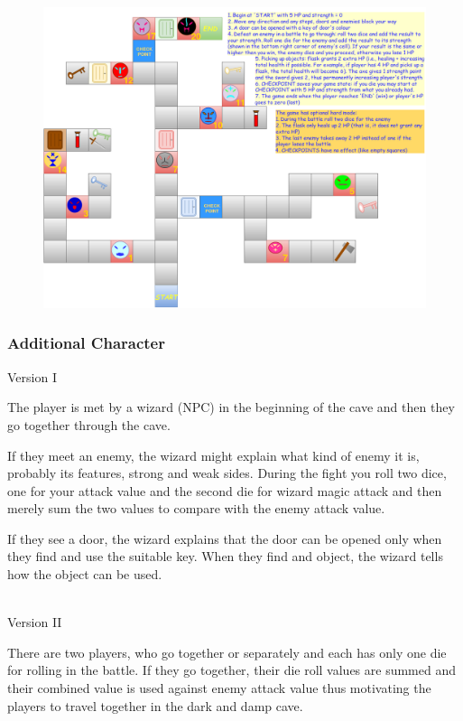\documentclass[landscape]{article}
\begin{document}
\thispagestyle{empty}

\begin{figure}[H]
  \centering
  \includegraphics[height=\textheight]{simpleGameDesign3.png}
\end{figure}

\newpage

\subsubsection*{Additional Character}

Version I

The player is met by a wizard (NPC) in the beginning of the cave and then they
go together through the cave.

If they meet an enemy, the wizard might explain what kind of enemy it is,
probably its features, strong and weak sides. During the fight you roll two
dice, one for your attack value and the second die for wizard magic attack and
then merely sum the two values to compare with the enemy attack value.

If they see a door, the wizard explains that the door can be opened only when
they find and use the suitable key. When they find and object, the wizard tells
how the object can be used.

\ \\

\noindent Version II

There are two players, who go together or separately and each has only one die
for rolling in the battle. If they go together, their die roll values are summed
and their combined value is used against enemy attack value thus motivating the
players to travel together in the dark and damp cave.
\end{document}
